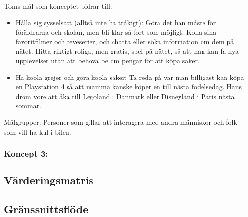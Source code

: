 \documentclass[a4paper,12pt,titlepage]{article}
\begin{document}
Toms mål som konceptet bidrar till:
\begin{itemize}
    \item Hålla sig sysselsatt (alltså inte ha
        tråkigt): Göra det han måste för
        föräldrarna och skolan, men bli klar så
        fort som möjligt. Kolla sina
        favoritfilmer och teveserier, och chatta
        eller söka information om dem på
        nätet. Hitta riktigt roliga, men gratis,
        spel på nätet, så att han kan få nya
        upplevelser utan att behöva be om
        pengar för att köpa saker. 
    \item Ha koola grejer och göra koola
        saker: Ta reda på var man billigast kan
        köpa en Playstation 4 så att mamma
        kanske köper en till nästa födelsedag.
        Hans dröm vore att åka till Legoland i
        Danmark eller Disneyland i Paris
        nästa sommar.
\end{itemize}

Målgrupper: Personer som gillar att interagera med andra människor och folk som
vill ha kul i bilen.

\subsubsection*{Koncept 3: }

\subsection*{Värderingsmatris}


\subsection*{Gränssnittsflöde}
\end{document}
